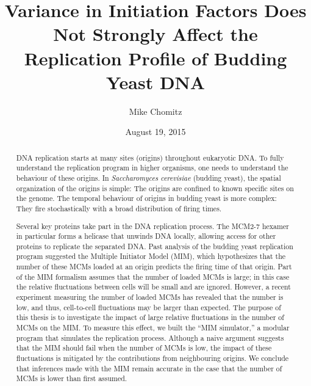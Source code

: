\documentclass[serif]{sfuthesis}
\title{Variance in Initiation Factors Does Not Strongly Affect the Replication Profile of Budding Yeast DNA}
\author{Mike Chomitz}
\date{August 19, 2015}
\begin{document}
\frontmatter
\maketitle %
\makecommittee %
\makecopyrightdeclaration %

\begin{abstract}
	DNA replication starts at many sites (origins) throughout eukaryotic DNA.
	To fully understand the replication program in higher organisms, one needs to understand the behaviour of these origins.
	In \emph{Saccharomyces cerevisiae} (budding yeast), the spatial organization of the origins is simple: The origins are confined to known specific sites on the genome.
	The temporal behaviour of origins in budding yeast is more complex: They fire stochastically with a broad distribution of firing times.
	
	Several key proteins take part in the DNA replication process.
	The MCM2-7 hexamer in particular forms a helicase that unwinds DNA locally, allowing access for other proteins to replicate the separated DNA.
	Past analysis of the budding yeast replication program suggested the Multiple Initiator Model (MIM), which hypothesizes that the number of these MCMs loaded at an origin predicts the firing time of that origin.
	Part of the MIM formalism assumes that the number of loaded MCMs is large; in this case the relative fluctuations between cells will be small and are ignored.
	However, a recent experiment measuring the number of loaded MCMs has revealed that the number is low, and thus, cell-to-cell fluctuations may be larger than expected.
	The purpose of this thesis is to investigate the impact of large relative fluctuations in the number of MCMs on the MIM.
	To measure this effect, we built the ``MIM simulator,'' a modular program that simulates the replication process.
	Although a naive argument suggests that the MIM should fail when the number of MCMs is low, the impact of these fluctuations is mitigated by the contributions from neighbouring origins.
	We conclude that inferences made with the MIM remain accurate in the case that the number of MCMs is lower than first assumed.
\end{abstract}
\end{document}
